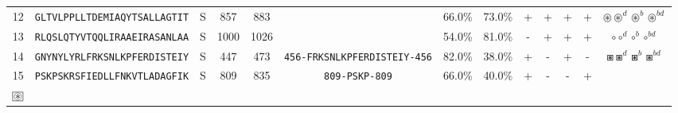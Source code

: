 \begin{tabular}{rcccccccccccc}
12 &  \texttt{GLTVLPPLLTDEMIAQYTSALLAGTIT} &       S &    857 &   883 &                                                                  &                          66.0\% &                           73.0\% &          + &           + &          + &           + &                                                                                   $ \circledast \circledast^d \circledast^b \circledast^{bd} $ \\
13 &  \texttt{RLQSLQTYVTQQLIRAAEIRASANLAA} &       S &   1000 &  1026 &                                                                  &                          54.0\% &                           81.0\% &          - &           + &          + &           + &                                                                                                           $ \circ \circ^d \circ^b \circ^{bd} $ \\
14 &  \texttt{GNYNYLYRLFRKSNLKPFERDISTEIY} &       S &    447 &   473 &  \texttt{{\scriptsize 456-}FRKSNLKPFERDISTEIY{\scriptsize -456}} &                          82.0\% &                           38.0\% &          + &           - &          + &           - &                                                                                                   $ \boxast \boxast^d \boxast^b \boxast^{bd} $ \\
15 &  \texttt{PSKPSKRSFIEDLLFNKVTLADAGFIK} &       S &    809 &   835 &                \texttt{{\scriptsize 809-}PSKP{\scriptsize -809}} &                          66.0\% &                           40.0\% &          + &           - &          - &           + &                             \Centerstack{  $\boxast \boxast^b \boxcircle \boxcircle^d$ \\  $\setlength{\fboxsep}{0.5pt} \boxed{\circledast}$ } \\
\bottomrule
\end{tabular}
